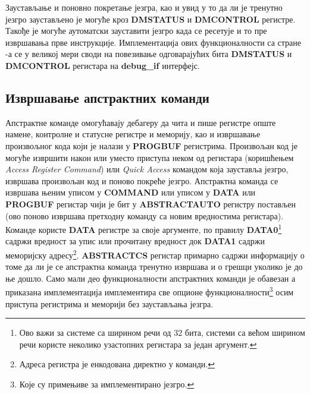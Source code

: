Заустављање и поновно покретање језгра, као и увид у то да ли је тренутно језгро заустављено је могуће кроз \textbf{\acrshort{DMSTATUS}} и \textbf{\acrshort{DMCONTROL}} регистре. Такође је могуће аутоматски зауставити језгро када се ресетује и то пре извршавања прве инструкције. Имплементација ових функционалности са стране -а се у великој мери своди на повезивање одговарајућих бита \textbf{\acrshort{DMSTATUS}} и \textbf{\acrshort{DMCONTROL}} регистара на \textbf{debug\_if} интерфејс.

\subsection{Извршавање апстрактних команди}

Апстрактне команде омогућавају дебагеру да чита и пише регистре опште намене, контролне и статусне регистре и меморију, као и извршавање произвољног кода који је налази у \textbf{\acrshort{PROGBUF}} регистрима. Произвољан код је могуће извршити након или уместо приступа неком од регистара (коришћењем \textit{Access Register Command}) или \textit{Quick Access} командом која зауставља језгро, извршава произвољан код и поново покреће језгро. Апстрактна команда се извршава њеним уписом у \textbf{COMMAND} или уписом у \textbf{DATA} или \textbf{\acrshort{PROGBUF}} регистар чији је бит у \textbf{ABSTRACTAUTO} регистру постављен (ово поново извршава претходну команду са новим вредностима регистара). Команде користе \textbf{DATA} регистре за своје аргументе, по правилу  \textbf{DATA0}\footnote{Ово важи за системе са ширином речи од 32 бита, системи са већом ширином речи користе неколико узастопних регистара за један аргумент.} садржи вредност за упис или прочитану вредност док \textbf{DATA1} садржи меморијску адресу\footnote{Адреса регистра је енкодована директно у команди.}. \textbf{\acrshort{ABSTRACTCS}} регистар примарно садржи информацију о томе да ли је се апстрактна команда тренутно извршава и о грешци уколико је до ње дошло. Само мали део функционалности апстрактних команди је обавезан а приказана имплементација имплементира све опционе функционалности\footnote{Које су примењиве за имплементирано језгро.} осим приступа регистрима и меморији без заустављања језгра.

